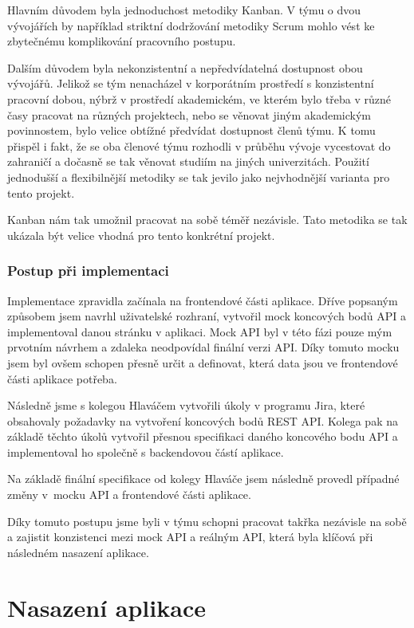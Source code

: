 Hlavním důvodem byla jednoduchost metodiky Kanban. V týmu o dvou vývojářích by napří\-klad striktní dodržování metodiky Scrum \cite{Scrum} mohlo vést ke zbytečnému komplikování pracovního postupu.

Dalším důvodem byla nekonzistentní a nepředvídatelná dostupnost obou vývojářů. Jelikož se tým nenacházel v korporátním prostředí s konzistentní pracovní dobou, nýbrž v prostředí akademickém, ve kterém bylo třeba v různé časy pracovat na různých projektech, nebo se věnovat jiným akademickým povinnostem, bylo velice obtížné předvídat dostupnost členů týmu. K tomu přispěl i fakt, že se oba členové týmu rozhodli v průběhu vývoje vycestovat do zahraničí a dočasně se tak věnovat studiím na jiných univerzitách. Použití jednodušší a flexibilnější metodiky se tak jevilo jako nejvhodnější varianta pro tento projekt.

Kanban nám tak umožnil pracovat na sobě téměř nezávisle. Tato metodika se tak ukázala být velice vhodná pro tento konkrétní projekt.

\subsubsection{Postup při implementaci}

Implementace zpravidla začínala na frontendové části aplikace. Dříve popsaným způsobem jsem navrhl uživatelské rozhraní, vytvořil mock koncových bodů API a implementoval danou strán\-ku v aplikaci. Mock API byl v této fázi pouze mým prvotním návrhem a zdaleka neodpovídal finální verzi API. Díky tomuto mocku jsem byl ovšem schopen přesně určit a definovat, která data jsou ve frontendové části aplikace potřeba.

Následně jsme s kolegou Hlaváčem vytvořili úkoly v programu Jira, které obsahovaly požada\-vky na vytvoření koncových bodů REST API. Kolega pak na základě těchto úkolů vytvořil přesnou specifikaci daného koncového bodu API a implementoval ho společně s backendovou částí aplikace.

Na základě finální specifikace od kolegy Hlaváče jsem následně provedl případné změny v~mocku API a frontendové části aplikace.

Díky tomuto postupu jsme byli v týmu schopni pracovat takřka nezávisle na sobě a zajistit konzistenci mezi mock API a reálným API, která byla klíčová při následném nasazení aplikace.

\section{Nasazení aplikace}

